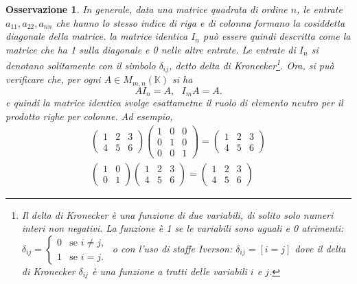 \documentclass{book}
\newtheorem{osservazione}{Osservazione}
\begin{document}
\begin{osservazione}
  In generale, data una matrice quadrata di ordine $n$, le entrate $a_{11}, a_{22}, a_{nn}$ che
  hanno lo stesso indice di riga e di colonna formano la cosiddetta \textit{diagonale della
    matrice}. la matrice identica $I_n$ può essere quindi descritta come la matrice che ha 1
  sulla diagonale e 0 nelle altre entrate. Le entrate di $I_n$ si denotano solitamente con il
  simbolo $\delta_{ij}$, detto \textit{delta di Kroneeker}\footnote{Il delta di Kronecker è una
    funzione di due variabili, di solito solo numeri interi non negativi. La funzione è 1 se le
    variabili sono uguali e 0 atrimenti: $\delta_{ij}=
    \begin{cases}
      0 & \text{se } i\neq j,\\
      1 & \text{se } i = j.
    \end{cases}$ o con l'uso di staffe Iverson: $\delta_{ij}=[i=j]$ dove il delta di Kronecker
    $\delta_{ij}$ è una funzione a tratti delle variabili $i$ e $j$.}.
  Ora, si puà verificare che, per ogni $A\in M_{m,n}(\mathbb{K})$ si ha
  \begin{equation*}
    AI_n=A, \text{ } I_mA=A.
  \end{equation*}
  e quindi la matrice identica svolge esattametne il ruolo di elemento neutro per il prodotto
  righe per colonne. Ad esempio,
  \begin{eqnarray*}
    \begin{pmatrix}
      1 &2&3\\
      4 &5 & 6
    \end{pmatrix}  \begin{pmatrix}
      1 &0&0\\
      0&1&0\\
      0&0&1
                   \end{pmatrix}
    =
    \begin{pmatrix}
      1 & 2& 3\\
      4 & 5 & 6
    \end{pmatrix}\\
    \begin{pmatrix}
      1 &0\\
      0 &1
    \end{pmatrix} 
    \begin{pmatrix}
      1 & 2& 3\\
      4 & 5 & 6
    \end{pmatrix}=
    \begin{pmatrix}
      1 & 2& 3\\
      4 & 5 & 6
    \end{pmatrix}
  \end{eqnarray*}
\end{osservazione}
\end{document}
